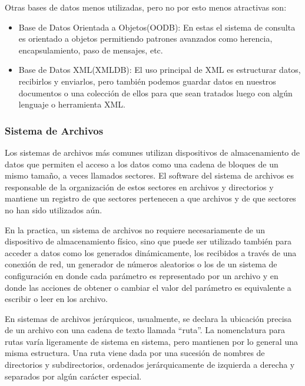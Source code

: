 Otras bases de datos menos utilizadas, pero no por esto menos atractivas son:

\begin{itemize}

	\item Base de Datos Orientada a Objetos(OODB): En estas el sistema de consulta es orientado a objetos permitiendo patrones avanzados como herencia, encapsulamiento, paso de mensajes, etc.
	
	\item Base de Datos XML(XMLDB): El uso principal de XML es estructurar datos, recibirlos y enviarlos, pero también podemos guardar datos en nuestros documentos o una colección de ellos para que sean tratados luego con algún lenguaje o herramienta XML.

\end{itemize}


\subsubsection{Sistema de Archivos}

Los sistemas de archivos más comunes utilizan dispositivos de almacenamiento de datos que permiten el acceso a los datos como una cadena de bloques de un mismo tamaño, a veces llamados sectores. El software del sistema de archivos es responsable de la organización de estos sectores en archivos y directorios y mantiene un registro de que sectores pertenecen a que archivos y de que sectores no han sido utilizados aún.

En la practica, un sistema de archivos no requiere necesariamente de un dispositivo de almacenamiento físico, sino que puede ser utilizado también para acceder a datos como los generados dinámicamente, los recibidos a través de una conexión de red, un generador de números aleatorios o los de un sistema de configuración en donde cada parámetro es representado por un archivo y en donde las acciones de obtener o cambiar el valor del parámetro es equivalente a escribir o leer en los archivo.

En sistemas de archivos jerárquicos, usualmente, se declara la ubicación precisa de un archivo con una cadena de texto llamada ``ruta''. La nomenclatura para rutas varía ligeramente de sistema en sistema, pero mantienen por lo general una misma estructura. Una ruta viene dada por una sucesión de nombres de directorios y subdirectorios, ordenados jerárquicamente de izquierda a derecha y separados por algún carácter especial.


